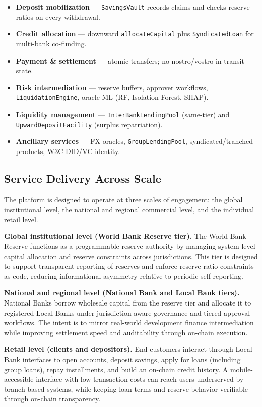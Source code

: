 \documentclass[12pt,a4paper]{report}
\begin{document}
\begin{itemize}[noitemsep]
\item \textbf{Deposit mobilization} --- \texttt{SavingsVault} records claims and checks reserve ratios on every withdrawal.
\item \textbf{Credit allocation} --- downward \texttt{allocateCapital} plus \texttt{SyndicatedLoan} for multi-bank co-funding.
\item \textbf{Payment \& settlement} --- atomic transfers; no nostro/vostro in-transit state.
\item \textbf{Risk intermediation} --- reserve buffers, approver workflows, \texttt{LiquidationEngine}, oracle ML (RF, Isolation Forest, SHAP).
\item \textbf{Liquidity management} --- \texttt{InterBankLendingPool} (same-tier) and \texttt{UpwardDepositFacility} (surplus repatriation).
\item \textbf{Ancillary services} --- FX oracles, \texttt{GroupLendingPool}, syndicated/tranched products, W3C DID/VC identity.
\end{itemize}

\subsection{Service Delivery Across Scale}

The platform is designed to operate at three scales of engagement: the global institutional level, the national and regional commercial level, and the individual retail level.

\textbf{Global institutional level (World Bank Reserve tier).} The World Bank Reserve functions as a programmable reserve authority by managing system-level capital allocation and reserve constraints across jurisdictions. This tier is designed to support transparent reporting of reserves and enforce reserve-ratio constraints as code, reducing informational asymmetry relative to periodic self-reporting.

\textbf{National and regional level (National Bank and Local Bank tiers).} National Banks borrow wholesale capital from the reserve tier and allocate it to registered Local Banks under jurisdiction-aware governance and tiered approval workflows. The intent is to mirror real-world development finance intermediation while improving settlement speed and auditability through on-chain execution.

\textbf{Retail level (clients and depositors).} End customers interact through Local Bank interfaces to open accounts, deposit savings, apply for loans (including group loans), repay installments, and build an on-chain credit history. A mobile-accessible interface with low transaction costs can reach users underserved by branch-based systems, while keeping loan terms and reserve behavior verifiable through on-chain transparency.
\end{document}
